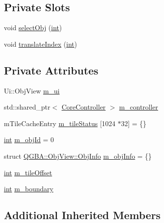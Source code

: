 \subsection*{Private Slots}
\begin{DoxyCompactItemize}
\item 
void \mbox{\hyperlink{class_q_g_b_a_1_1_obj_view_a2f9e25964e38bf4060fe68878bf8a963}{select\+Obj}} (\mbox{\hyperlink{ioapi_8h_a787fa3cf048117ba7123753c1e74fcd6}{int}})
\item 
void \mbox{\hyperlink{class_q_g_b_a_1_1_obj_view_a1255ade4d66e55d2996344fb71ac3d99}{translate\+Index}} (\mbox{\hyperlink{ioapi_8h_a787fa3cf048117ba7123753c1e74fcd6}{int}})
\end{DoxyCompactItemize}
\subsection*{Private Attributes}
\begin{DoxyCompactItemize}
\item 
Ui\+::\+Obj\+View \mbox{\hyperlink{class_q_g_b_a_1_1_obj_view_aa209ce0ce7be4064b036bbc37258fab9}{m\+\_\+ui}}
\item 
std\+::shared\+\_\+ptr$<$ \mbox{\hyperlink{class_q_g_b_a_1_1_core_controller}{Core\+Controller}} $>$ \mbox{\hyperlink{class_q_g_b_a_1_1_obj_view_ad99aa5987b9d7497f8d82d0c874a8a8b}{m\+\_\+controller}}
\item 
m\+Tile\+Cache\+Entry \mbox{\hyperlink{class_q_g_b_a_1_1_obj_view_a4d0ad846c0e6a3c21cba7ff7d57003e5}{m\+\_\+tile\+Status}} \mbox{[}1024 $\ast$32\mbox{]} = \{\}
\item 
\mbox{\hyperlink{ioapi_8h_a787fa3cf048117ba7123753c1e74fcd6}{int}} \mbox{\hyperlink{class_q_g_b_a_1_1_obj_view_aec07e20b15b5591dee591af3f3efed8e}{m\+\_\+obj\+Id}} = 0
\item 
struct \mbox{\hyperlink{struct_q_g_b_a_1_1_obj_view_1_1_obj_info}{Q\+G\+B\+A\+::\+Obj\+View\+::\+Obj\+Info}} \mbox{\hyperlink{class_q_g_b_a_1_1_obj_view_a7daa54c2ed15650e32e136eb05c72b72}{m\+\_\+obj\+Info}} = \{\}
\item 
\mbox{\hyperlink{ioapi_8h_a787fa3cf048117ba7123753c1e74fcd6}{int}} \mbox{\hyperlink{class_q_g_b_a_1_1_obj_view_a2169350d3fde21673993d4eb6f9525b2}{m\+\_\+tile\+Offset}}
\item 
\mbox{\hyperlink{ioapi_8h_a787fa3cf048117ba7123753c1e74fcd6}{int}} \mbox{\hyperlink{class_q_g_b_a_1_1_obj_view_a371db378a6ae8e1d9e870fae878a5023}{m\+\_\+boundary}}
\end{DoxyCompactItemize}
\subsection*{Additional Inherited Members}


